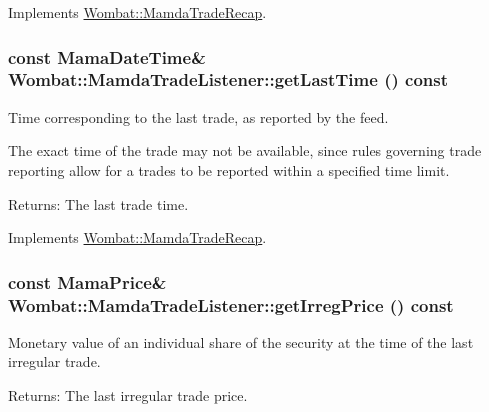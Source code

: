 Implements \hyperlink{classWombat_1_1MamdaTradeRecap_67a37388f66bd17d38a51e72c09d9549}{Wombat::Mamda\-Trade\-Recap}.\hypertarget{classWombat_1_1MamdaTradeListener_e113087de67a4d24fae82add1dfdaba2}{
\subsubsection[getLastTime]{\setlength{\rightskip}{0pt plus 5cm}const Mama\-Date\-Time\& Wombat::Mamda\-Trade\-Listener::get\-Last\-Time () const}}
\label{classWombat_1_1MamdaTradeListener_e113087de67a4d24fae82add1dfdaba2}


Time corresponding to the last trade, as reported by the feed. 

The exact time of the trade may not be available, since rules governing trade reporting allow for a trades to be reported within a specified time limit.

\begin{Desc}
\item[Returns:]The last trade time. \end{Desc}


Implements \hyperlink{classWombat_1_1MamdaTradeRecap_b589580af79ac95e51a3055014c99d2e}{Wombat::Mamda\-Trade\-Recap}.\hypertarget{classWombat_1_1MamdaTradeListener_95fdb22b7d58d3767d31a82ced35df77}{
\subsubsection[getIrregPrice]{\setlength{\rightskip}{0pt plus 5cm}const Mama\-Price\& Wombat::Mamda\-Trade\-Listener::get\-Irreg\-Price () const}}
\label{classWombat_1_1MamdaTradeListener_95fdb22b7d58d3767d31a82ced35df77}


Monetary value of an individual share of the security at the time of the last irregular trade. 

\begin{Desc}
\item[Returns:]The last irregular trade price. \end{Desc}


